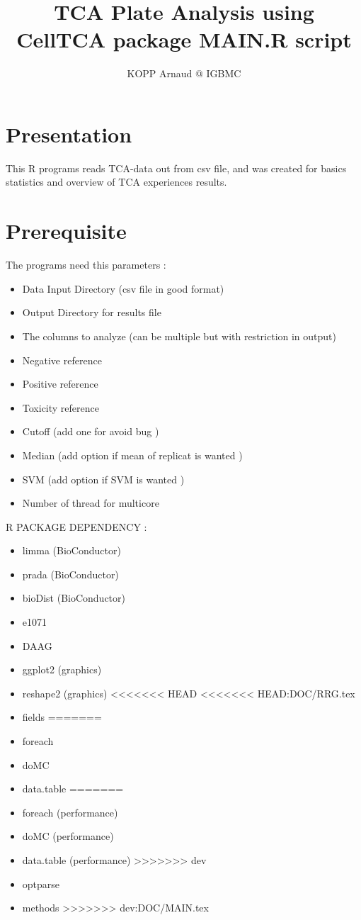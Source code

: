 \documentclass[a4paper,10pt]{article}
\author{KOPP Arnaud @ IGBMC}
\title {TCA Plate Analysis using CellTCA package MAIN.R script}
\begin{document}
\maketitle


\section*{Presentation}
This R programs reads TCA-data out from csv file, and was created for basics statistics and overview of TCA experiences results.


\section*{Prerequisite}


The programs need this parameters :
\begin{itemize}
  \item Data Input Directory (csv file in good format)
  \item Output Directory for results file
  \item The columns to analyze (can be multiple but with restriction in output)
  \item Negative reference
  \item Positive reference
  \item Toxicity reference
  \item Cutoff (add one for avoid bug )
  \item Median (add option if mean of replicat is wanted )
  \item SVM (add option if SVM is wanted )
  \item Number of thread for multicore
\end{itemize}

\vspace{1cm}

R PACKAGE DEPENDENCY :
\begin{itemize}
  \item limma (BioConductor)
  \item prada (BioConductor)
  \item bioDist (BioConductor)
  \item e1071
  \item DAAG
  \item ggplot2 (graphics)
  \item reshape2 (graphics)
<<<<<<< HEAD
<<<<<<< HEAD:DOC/RRG.tex
  \item fields
=======
  \item foreach
  \item doMC
  \item data.table
=======
  \item foreach (performance)
  \item doMC (performance)
  \item data.table (performance)
>>>>>>> dev
  \item optparse
  \item methods
>>>>>>> dev:DOC/MAIN.tex
\end{itemize}
\end{document}
